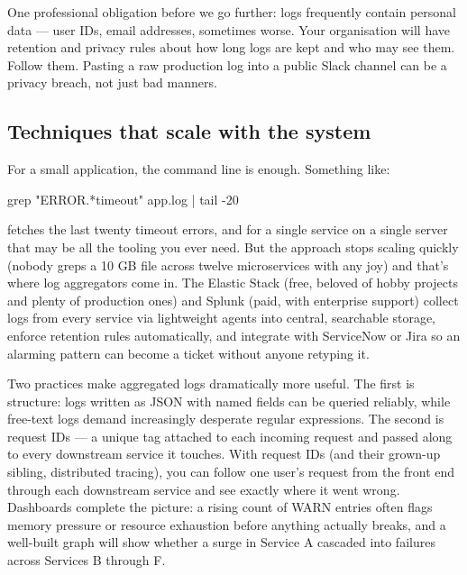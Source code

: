 One professional obligation before we go further: logs frequently contain personal data — user IDs, email addresses, sometimes worse. Your organisation will have retention and privacy rules about how long logs are kept and who may see them. Follow them. Pasting a raw production log into a public Slack channel can be a privacy breach, not just bad manners.



\subsection{Techniques that scale with the system}


For a small application, the command line is enough. Something like:



\begin{CodeBlock}
grep "ERROR.*timeout" app.log | tail -20
\end{CodeBlock}


fetches the last twenty timeout errors, and for a single service on a single server that may be all the tooling you ever need. But the approach stops scaling quickly (nobody greps a 10 GB file across twelve microservices with any joy) and that's where log aggregators come in. The Elastic Stack (free, beloved of hobby projects and plenty of production ones) and Splunk (paid, with enterprise support) collect logs from every service via lightweight agents into central, searchable storage, enforce retention rules automatically, and integrate with ServiceNow or Jira so an alarming pattern can become a ticket without anyone retyping it.


Two practices make aggregated logs dramatically more useful. The first is structure: logs written as JSON with named fields can be queried reliably, while free-text logs demand increasingly desperate regular expressions. The second is request IDs — a unique tag attached to each incoming request and passed along to every downstream service it touches. With request IDs (and their grown-up sibling, distributed tracing), you can follow one user's request from the front end through each downstream service and see exactly where it went wrong. Dashboards complete the picture: a rising count of WARN entries often flags memory pressure or resource exhaustion before anything actually breaks, and a well-built graph will show whether a surge in Service A cascaded into failures across Services B through F.


